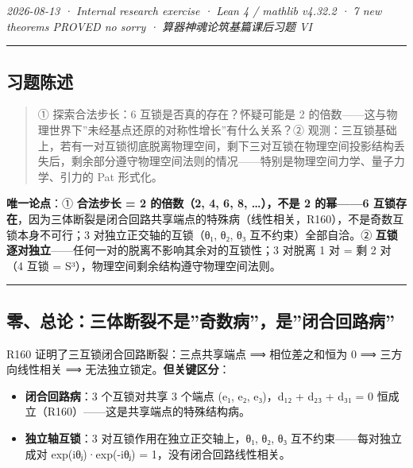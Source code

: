 \documentclass[
]{article}
\providecommand{\tightlist}{%
  \setlength{\itemsep}{0pt}\setlength{\parskip}{0pt}}
\begin{document}
\emph{2026-08-13 · Internal research exercise · Lean 4 / mathlib v4.32.2
· 7 new theorems PROVED no sorry · 算器神魂论筑基篇课后习题 VI }

\begin{center}\rule{0.5\linewidth}{0.5pt}\end{center}

\subsection{习题陈述}\label{ux4e60ux9898ux9648ux8ff0}

\begin{quote}
① 探索合法步长：6 互锁是否真的存在？怀疑可能是 2
的倍数------这与物理世界下''未经基点还原的对称性增长''有什么关系？②
观测：三互锁基础上，若有一对互锁彻底脱离物理空间，剩下三对互锁在物理空间投影结构丢失后，剩余部分遵守物理空间法则的情况------特别是物理空间力学、量子力学、引力的
Pat 形式化。
\end{quote}

\textbf{唯一论点}：① \textbf{合法步长 = 2 的倍数（2, 4, 6, 8,
\ldots），不是 2 的幂------6
互锁存在}，因为三体断裂是闭合回路共享端点的特殊病（线性相关，R160），不是奇数互锁本身不可行；3
对独立正交轴的互锁（θ₁, θ₂, θ₃ 互不约束）全部自洽。②
\textbf{互锁逐对独立}------任何一对的脱离不影响其余对的互锁性；3 对脱离
1 对 = 剩 2 对（4 互锁 = S³），物理空间剩余结构遵守物理空间法则。

\begin{center}\rule{0.5\linewidth}{0.5pt}\end{center}

\subsection{零、总论：三体断裂不是''奇数病''，是''闭合回路病''}\label{ux96f6ux603bux8bbaux4e09ux4f53ux65adux88c2ux4e0dux662fux5947ux6570ux75c5ux662fux95edux5408ux56deux8defux75c5}

R160 证明了三互锁闭合回路断裂：三点共享端点 ⟹ 相位差之和恒为 0 ⟹
三方向线性相关 ⟹ 无法独立锁定。\textbf{但关键区分}：

\begin{itemize}
\tightlist
\item
  \textbf{闭合回路病}：3 个互锁对共享 3 个端点 (e₁, e₂, e₃)，d₁₂ + d₂₃ +
  d₃₁ = 0 恒成立（R160）------这是共享端点的特殊结构病。
\item
  \textbf{独立轴互锁}：3 对互锁作用在独立正交轴上，θ₁, θ₂, θ₃
  互不约束------每对独立成对 exp(iθⱼ)·exp(-iθⱼ) =
  1，没有闭合回路线性相关。
\end{itemize}
\end{document}
